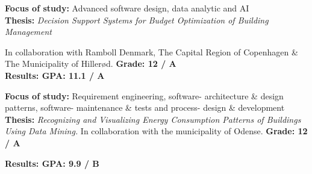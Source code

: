 
\textbf{Focus of study:} Advanced software design, data analytic and AI \\
\textbf{Thesis:} \emph{Decision Support Systems for Budget Optimization of Building Management}

In collaboration with Ramboll Denmark, The Capital Region of Copenhagen \& The Municipality of Hillerød. \textbf{Grade: 12 / A}\\
\textbf{Results: GPA: 11.1 / A}

\divider

\textbf{Focus of study:} Requirement engineering, software- architecture \& design patterns, software- maintenance \& tests and process- design \& development\\
\textbf{Thesis:} \emph{Recognizing and Visualizing Energy Consumption Patterns of Buildings Using Data Mining.} In collaboration with the municipality of Odense. \textbf{Grade: 12 / A} 

\textbf{Results: GPA: 9.9 / B}
